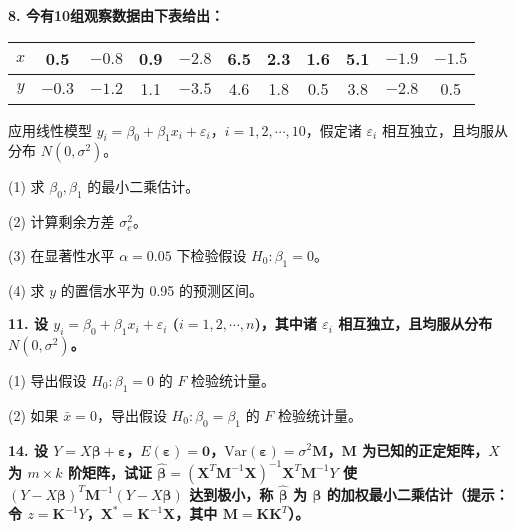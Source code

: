 \documentclass[12pt]{article}
\begin{document}
\textbf{8. 今有10组观察数据由下表给出：}

\begin{center}
\begin{tabular}{|c|c|c|c|c|c|c|c|c|c|c|}
\hline
$x$ & 0.5 & $-0.8$ & 0.9 & $-2.8$ & 6.5 & 2.3 & 1.6 & 5.1 & $-1.9$ & $-1.5$ \\
\hline
$y$ & $-0.3$ & $-1.2$ & 1.1 & $-3.5$ & 4.6 & 1.8 & 0.5 & 3.8 & $-2.8$ & 0.5 \\
\hline
\end{tabular}
\end{center}

应用线性模型 $y_i = \beta_0 + \beta_1 x_i + \varepsilon_i$，$i = 1,2,\cdots,10$，假定诸 $\varepsilon_i$ 相互独立，且均服从分布 $N(0,\sigma^2)$。

(1) 求 $\beta_0, \beta_1$ 的最小二乘估计。

(2) 计算剩余方差 $\sigma_e^2$。

(3) 在显著性水平 $\alpha = 0.05$ 下检验假设 $H_0: \beta_1 = 0$。

(4) 求 $y$ 的置信水平为 0.95 的预测区间。

\vspace{1em}

\textbf{11. 设 $y_i = \beta_0 + \beta_1 x_i + \varepsilon_i$ ($i = 1, 2, \cdots, n$)，其中诸 $\varepsilon_i$ 相互独立，且均服从分布 $N(0, \sigma^2)$。}

(1) 导出假设 $H_0: \beta_1 = 0$ 的 $F$ 检验统计量。

(2) 如果 $\bar{x} = 0$，导出假设 $H_0: \beta_0 = \beta_1$ 的 $F$ 检验统计量。

\vspace{1em}

\textbf{14. 设 $Y = X\boldsymbol{\beta} + \boldsymbol{\varepsilon}$，$E(\boldsymbol{\varepsilon}) = \mathbf{0}$，$\text{Var}(\boldsymbol{\varepsilon}) = \sigma^2 \mathbf{M}$，$\mathbf{M}$ 为已知的正定矩阵，$X$ 为 $m \times k$ 阶矩阵，试证 $\hat{\boldsymbol{\beta}} = (\mathbf{X}^T\mathbf{M}^{-1}\mathbf{X})^{-1}\mathbf{X}^T\mathbf{M}^{-1}Y$ 使 $(Y - X\boldsymbol{\beta})^T\mathbf{M}^{-1}(Y - X\boldsymbol{\beta})$ 达到极小，称 $\hat{\boldsymbol{\beta}}$ 为 $\boldsymbol{\beta}$ 的加权最小二乘估计（提示：令 $z = \mathbf{K}^{-1}Y$，$\mathbf{X}^* = \mathbf{K}^{-1}\mathbf{X}$，其中 $\mathbf{M} = \mathbf{K}\mathbf{K}^T$）。}
\end{document}
